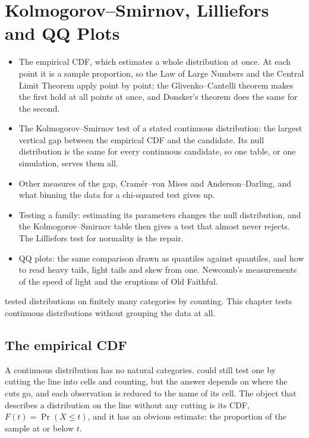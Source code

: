 \chapter{Kolmogorov--Smirnov, Lilliefors and QQ Plots}
\label{ch:ks}

\begin{chaptergoals}
\begin{itemize}[nosep]
\item The empirical CDF, which estimates a whole distribution at once. At each point it is a sample proportion, so the Law of Large Numbers and the Central Limit Theorem apply point by point; the Glivenko--Cantelli theorem makes the first hold at all points at once, and Donsker's theorem does the same for the second.
\item The Kolmogorov--Smirnov test of a stated continuous distribution: the largest vertical gap between the empirical CDF and the candidate. Its null distribution is the same for every continuous candidate, so one table, or one simulation, serves them all.
\item Other measures of the gap, Cram\'er--von Mises and Anderson--Darling, and what binning the data for a chi-squared test gives up.
\item Testing a family: estimating its parameters changes the null distribution, and the Kolmogorov--Smirnov table then gives a test that almost never rejects. The Lilliefors test for normality is the repair.
\item QQ plots: the same comparison drawn as quantiles against quantiles, and how to read heavy tails, light tails and skew from one. Newcomb's measurements of the speed of light and the eruptions of Old Faithful.
\end{itemize}
 tested distributions on finitely many categories by counting. This chapter tests continuous distributions without grouping the data at all.
\end{chaptergoals}

\section{The empirical CDF}
\label{sec:ks-ecdf}

A continuous distribution has no natural categories.
 could still test one by cutting the line into cells and counting, but the answer depends on where the cuts go, and each observation is reduced to the name of its cell.
The object that describes a distribution on the line without any cutting is its CDF, $F(t) = \Pr(X \leq t)$, and it has an obvious estimate: the proportion of the sample at or below $t$.

